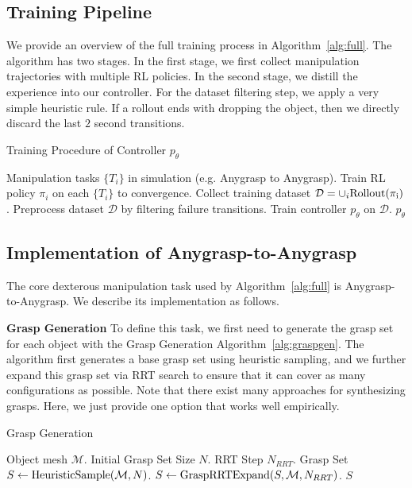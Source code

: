 \subsection{\mname{} Training Pipeline}
We provide an overview of the full training process in Algorithm~\ref{alg:full}. The algorithm has two stages. In the first stage, we first collect manipulation trajectories with multiple RL policies. In the second stage, we distill the experience into our controller. For the dataset filtering step, we apply a very simple heuristic rule. If a rollout ends with dropping the object, then we directly discard the last $2$ second transitions. 

\begin{algorithm}[htbp]
\caption{Training Procedure of \mname{} Controller $p_\theta$}\label{alg:full}
\begin{algorithmic}[1]
\REQUIRE Manipulation tasks $\{T_i\}$ in simulation (e.g. Anygrasp to Anygrasp).
\STATE Train RL policy $\pi_i$ on each $\{T_i\}$ to convergence.
\STATE Collect training dataset $\mathcal{D}=\cup_i \small {\rm Rollout(\pi_i)}$. 
\STATE Preprocess dataset $\mathcal{D}$ by filtering failure transitions.
\STATE Train \mname{} controller $p_\theta$ on $\mathcal{D}$.
\RETURN $p_\theta$
\end{algorithmic}
\end{algorithm}

\subsection{Implementation of Anygrasp-to-Anygrasp}
The core dexterous manipulation task used by Algorithm~\ref{alg:full} is Anygrasp-to-Anygrasp. We describe its implementation as follows. 

\textbf{Grasp Generation} To define this task, we first need to generate the grasp set for each object with the Grasp Generation Algorithm~\ref{alg:graspgen}. The algorithm first generates a base grasp set using heuristic sampling, and we further expand this grasp set via RRT search to ensure that it can cover as many configurations as possible. Note that there exist many approaches for synthesizing grasps. Here, we just provide one option that works well empirically.

\begin{algorithm}[htbp]
\caption{Grasp Generation}\label{alg:graspgen}
\begin{algorithmic}[1]
\REQUIRE Object mesh $\mathcal{M}$. Initial Grasp Set Size $N$. RRT Step $N_{RRT}$.
\STATE Grasp Set $S\leftarrow {\rm HeuristicSample}(\mathcal{M}, N)$.
\STATE $S\leftarrow {\rm GraspRRTExpand} (S, \mathcal{M}, N_{RRT})$.
\RETURN $S$
\end{algorithmic}
\end{algorithm}

